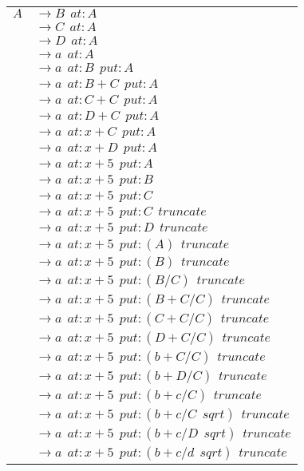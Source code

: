 \subsubsection{}
\begin{tabular}{l l}
$A$ & $\longrightarrow B \ \ at: A$ \\
	& $\longrightarrow C \ \ at: A$ \\
	& $\longrightarrow D \ \ at: A$ \\
	& $\longrightarrow a \ \ at: A$ \\
	& $\longrightarrow a \ \ at: B \ \ put: A$ \\
	& $\longrightarrow a \ \ at: B + C \ \ put: A$ \\
	& $\longrightarrow a \ \ at: C + C \ \ put: A$ \\
	& $\longrightarrow a \ \ at: D + C \ \ put: A$ \\
	& $\longrightarrow a \ \ at: x + C \ \ put: A$ \\
	& $\longrightarrow a \ \ at: x + D \ \ put: A$ \\
	& $\longrightarrow a \ \ at: x + 5 \ \ put: A$ \\
	& $\longrightarrow a \ \ at: x + 5 \ \ put: B$ \\
	& $\longrightarrow a \ \ at: x + 5 \ \ put: C$ \\
	& $\longrightarrow a \ \ at: x + 5 \ \ put: C \ \ truncate$ \\
	& $\longrightarrow a \ \ at: x + 5 \ \ put: D \ \ truncate$ \\
	& $\longrightarrow a \ \ at: x + 5 \ \ put: (A) \ \ truncate$ \\
	& $\longrightarrow a \ \ at: x + 5 \ \ put: (B) \ \ truncate$ \\
	& $\longrightarrow a \ \ at: x + 5 \ \ put: (B / C) \ \ truncate$ \\
	& $\longrightarrow a \ \ at: x + 5 \ \ put: (B + C / C) \ \ truncate$ \\
	& $\longrightarrow a \ \ at: x + 5 \ \ put: (C + C / C) \ \ truncate$ \\
	& $\longrightarrow a \ \ at: x + 5 \ \ put: (D + C / C) \ \ truncate$ \\
	& $\longrightarrow a \ \ at: x + 5 \ \ put: (b + C / C) \ \ truncate$ \\
	& $\longrightarrow a \ \ at: x + 5 \ \ put: (b + D / C) \ \ truncate$ \\
	& $\longrightarrow a \ \ at: x + 5 \ \ put: (b + c / C) \ \ truncate$ \\
	& $\longrightarrow a \ \ at: x + 5 \ \ put: (b + c / C \ \ sqrt) \ \ truncate$ \\
	& $\longrightarrow a \ \ at: x + 5 \ \ put: (b + c / D \ \ sqrt) \ \ truncate$ \\
	& $\longrightarrow a \ \ at: x + 5 \ \ put: (b + c / d \ \ sqrt) \ \ truncate$ \\
\end{tabular}